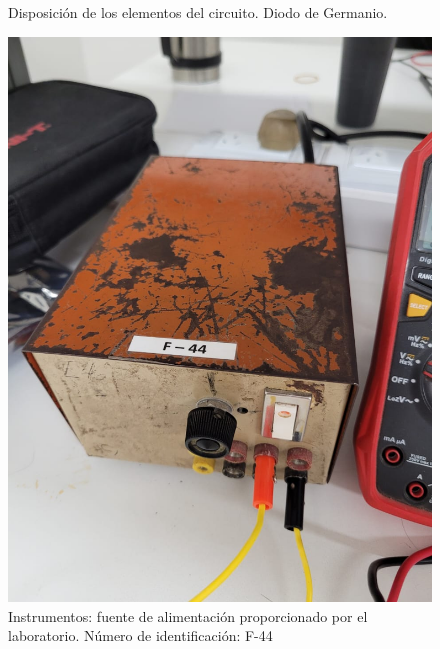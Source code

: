 \documentclass[chaptersright]{informeutn}
\begin{document}
\begin{figure}[H]
\begin{minipage}{0.5\textwidth}
            \caption{Disposición de los elementos del circuito. Diodo de Germanio.}
            \label{fig:germanio}
        \end{minipage}
    \end{figure}
    \begin{figure}[H]
        \centering
        \begin{minipage}{0.3\textwidth}
            \centering
            \includegraphics[width=\textwidth]{pictures/fuentealim.jpeg}
            \caption{Instrumentos: fuente de alimentación proporcionado por el laboratorio. Número de identificación: F-44}
        \end{minipage}
        \hspace{0.05\textwidth} %
        \begin{minipage}{0.3\textwidth}
            \centering

\end{minipage}
\end{figure}
\end{document}
